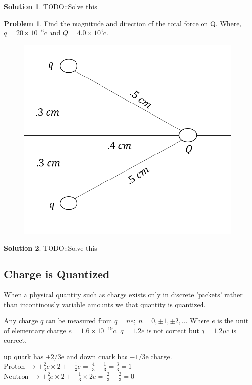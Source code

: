 \documentclass[12pt]{article}
\theoremstyle{definition}
\newtheorem{prob}{Problem}[section]
\newtheorem*{soln}{Solution}
\newcommand{\e}[1]{\times10^{#1}}
\begin{document}
\begin{soln}
    TODO::Solve this 
\end{soln}
\begin{prob}
    Find the magnitude and direction of the total force on Q. Where, $ q=20\e{-6} $c and $ Q=4.0\e{6} $c.
    \begin{figure}[H]
        \centering
        \includegraphics[scale=.5]{5.png}
        \label{fig:prob3}
    \end{figure}
\end{prob}
\begin{soln}
    TODO::Solve this 
\end{soln}
\subsection{Charge is Quantized}
When a physical quantity such as charge exists only in discrete 'packets' rather than incontinously variable amounts we that quantity is quantized.

Any charge $ q $ can be measured from $ q=ne;\ n=0,\pm1,\pm2,\dots $ Where $ e $ is the unit of elementary charge $ e=1.6\e{-19} $c. $ q=1.2e $ is not correct but $ q=1.2\mu c $ is correct.

up quark has $ +2/3 $e and down quark has $ -1/3 $e charge.\\
Proton $\displaystyle \to +\frac{2}{3}e\times2+ -\frac{1}{3}e=\ \frac{4}{3}-\frac{1}{3}=\frac{3}{3}=1 $\\
Neutron $\displaystyle \to +\frac{2}{3}e\times2+ -\frac{1}{3}\times2e=\ \frac{2}{3}-\frac{2}{3}=0 $\\
\end{document}
